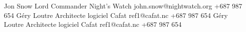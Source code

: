 %
%
%


\begin{referees}
		{Jon Snow}
		{Lord Commander}
		{Night's Watch}
		{john.snow@nightwatch.org}
		{+687 987 654}
		{Géry Loutre}
		{Architecte logiciel}
		{Cafat}
		{ref1@cafat.nc}
		{+687 987 654}
		{Géry Loutre}
		{Architecte logiciel}
		{Cafat}
		{ref1@cafat.nc}
		{+687 987 654}
\end{referees}

